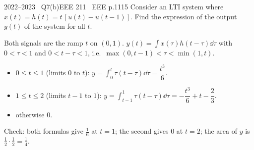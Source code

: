 \begin{qcard}{2022--2023 \textbullet\ Q7(b)}{EEE 211 \textbullet\ EEE p.11}{15}
Consider an LTI system where $x(t)=h(t)=t\,[u(t)-u(t-1)]$. Find the expression of the output $y(t)$ of the system for all $t$.
\end{qcard}
\begin{solution}
Both signals are the ramp $t$ on $(0,1)$. $y(t)=\int x(\tau)h(t-\tau)\dd\tau$ with $0<\tau<1$ and $0<t-\tau<1$, i.e.\ $\max(0,t-1)<\tau<\min(1,t)$.
\begin{itemize}[leftmargin=1.4em,itemsep=2pt]
\item $0\le t\le1$ (limits $0$ to $t$): $y=\int_0^t\tau(t-\tau)\dd\tau=\dfrac{t^3}{6}$.
\item $1\le t\le2$ (limits $t-1$ to $1$): $y=\int_{t-1}^{1}\tau(t-\tau)\dd\tau=-\dfrac{t^3}{6}+t-\dfrac23$.
\item otherwise $0$.
\end{itemize}
Check: both formulas give $\frac16$ at $t=1$; the second gives $0$ at $t=2$; the area of $y$ is $\frac12\cdot\frac12=\frac14$.
\begin{center}\end{center}
\end{solution}

